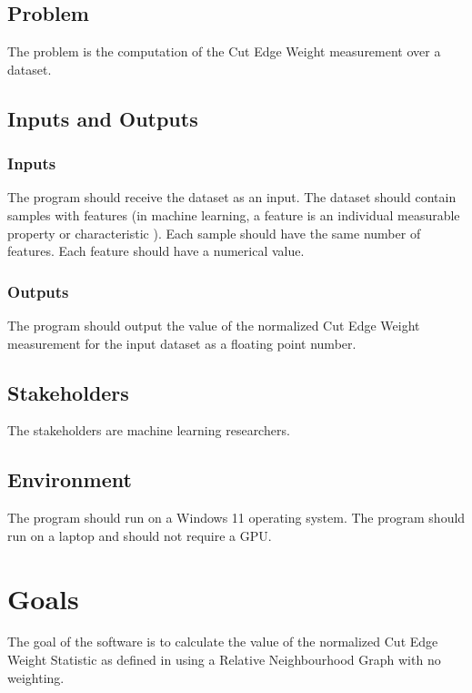 \documentclass{article}
\begin{document}
\subsection{Problem}

The problem is the computation of the Cut Edge Weight measurement over a dataset.

\subsection{Inputs and Outputs}

\subsubsection{Inputs}

The program should receive the dataset as an input. 
The dataset should contain samples with features (in machine learning, a feature is an individual measurable property or characteristic \cite{bishop_pattern_2006}). 
Each sample should have the same number of features. 
Each feature should have a numerical value.

\subsubsection{Outputs}

The program should output the value of the normalized Cut Edge Weight measurement for the input dataset as a floating point number.

\subsection{Stakeholders}

The stakeholders are machine learning researchers.

\subsection{Environment}

The program should run on a Windows 11 operating system. 
The program should run on a laptop and should not require a GPU.

\section{Goals}

The goal of the software is to calculate the value of the normalized Cut Edge Weight Statistic as defined in \cite{zighed_statistical_2005} using a Relative Neighbourhood Graph with no weighting.
\end{document}
